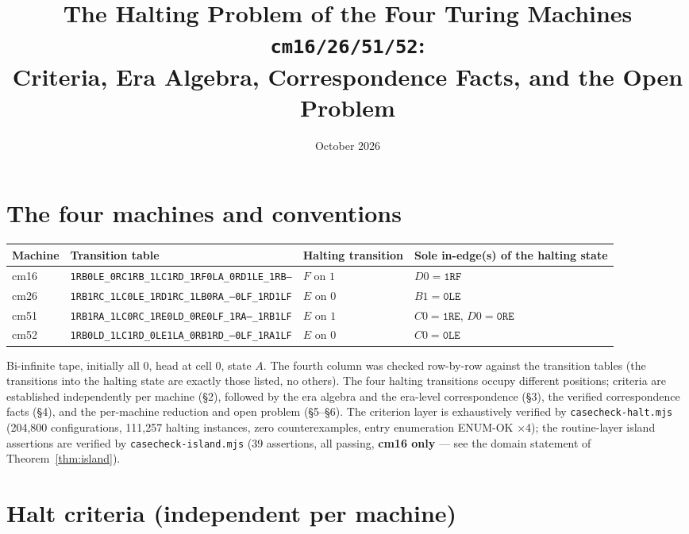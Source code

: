 \documentclass[11pt]{amsart}
\title{The Halting Problem of the Four Turing Machines \texttt{cm16/26/51/52}:\\ Criteria, Era Algebra, Correspondence Facts, and the Open Problem}
\author{}
\date{October 2026}
\begin{document}
\maketitle

\section{The four machines and conventions}

\begin{center}\small
\begin{tabular}{llll}
\toprule
Machine & Transition table & Halting transition & Sole in-edge(s) of the halting state\\
\midrule
cm16 & \texttt{1RB0LE\_0RC1RB\_1LC1RD\_1RF0LA\_0RD1LE\_1RB---} & $F$ on $1$ & $D0=\texttt{1RF}$\\
cm26 & \texttt{1RB1RC\_1LC0LE\_1RD1RC\_1LB0RA\_---0LF\_1RD1LF} & $E$ on $0$ & $B1=\texttt{0LE}$\\
cm51 & \texttt{1RB1RA\_1LC0RC\_1RE0LD\_0RE0LF\_1RA---\_1RB1LF} & $E$ on $1$ & $C0=\texttt{1RE}$, $D0=\texttt{0RE}$\\
cm52 & \texttt{1RB0LD\_1LC1RD\_0LE1LA\_0RB1RD\_---0LF\_1RA1LF} & $E$ on $0$ & $C0=\texttt{0LE}$\\
\bottomrule
\end{tabular}
\end{center}

Bi-infinite tape, initially all $0$, head at cell $0$, state $A$. The fourth column was checked row-by-row against the transition tables (the transitions into the halting state are exactly those listed, no others). The four halting transitions occupy different positions; criteria are established independently per machine (\S2), followed by the era algebra and the era-level correspondence (\S3), the verified correspondence facts (\S4), and the per-machine reduction and open problem (\S5--\S6). The criterion layer is exhaustively verified by \texttt{casecheck-halt.mjs} (204,800 configurations, 111,257 halting instances, zero counterexamples, entry enumeration ENUM-OK $\times$4); the routine-layer island assertions are verified by \texttt{casecheck-island.mjs} (39 assertions, all passing, \textbf{cm16 only} --- see the domain statement of Theorem~\ref{thm:island}).

\section{Halt criteria (independent per machine)}
\end{document}
